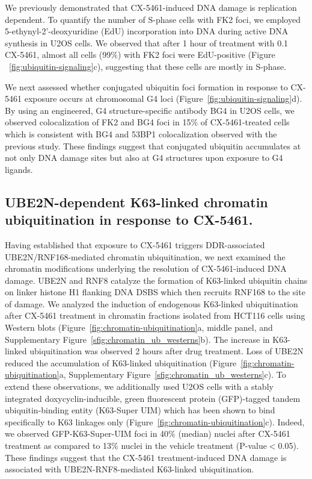 We previously demonstrated that CX-5461-induced DNA damage is replication dependent\cite{Xu2017}. To quantify the number of S-phase cells with FK2 foci, we employed 5-ethynyl-2'-deoxyuridine (EdU) incorporation into DNA during active DNA synthesis in U2OS cells. We observed that after 1 hour of treatment with \SI{0,1}{\micro\Molar} CX-5461, almost all cells (99\%) with FK2 foci were EdU-positive (Figure ~\ref{fig:ubiquitin-signaling}c), suggesting that these cells are mostly in S-phase.

We next assessed whether conjugated ubiquitin foci formation in response to CX-5461 exposure occurs at chromosomal G4 loci (Figure~\ref{fig:ubiquitin-signaling}d). By using an engineered, G4 structure-specific antibody BG4\cite{Biffi2013b} in U2OS cells, we observed colocalization of FK2 and BG4 foci in 15\% of CX-5461-treated cells which is consistent with BG4 and 53BP1 colocalization observed with the previous study\cite{Xu2017}. These findings suggest that conjugated ubiquitin accumulates at not only DNA damage sites but also at G4 structures upon exposure to G4 ligands.   

\subsection{UBE2N-dependent K63-linked chromatin ubiquitination in response to CX-5461.}
Having established that exposure to CX-5461 triggers DDR-associated UBE2N/RNF168-mediated chromatin ubiquitination, we next examined the chromatin modifications underlying the resolution of CX-5461-induced DNA damage. UBE2N and RNF8 catalyze the formation of K63-linked ubiquitin chains on linker histone H1 flanking DNA DSBS which then recruits RNF168 to the site of damage\cite{Thorslund2015}. We analyzed the induction of endogenous K63-linked ubiquitination after CX-5461 treatment in chromatin fractions isolated from HCT116 cells using Western blots (Figure~\ref{fig:chromatin-ubiquitination}a, middle panel, and Supplementary Figure~\ref{sfig:chromatin_ub_westerns}b). The increase in K63-linked ubiquitination was observed 2 hours after drug treatment. Loss of UBE2N reduced the accumulation of K63-linked ubiquitination (Figure~\ref{fig:chromatin-ubiquitination}a, Supplementary Figure~\ref{sfig:chromatin_ub_westerns}c). To extend these observations, we additionally used U2OS cells with a stably integrated doxycyclin-inducible, green fluorescent protein (GFP)-tagged tandem ubiquitin-binding entity (K63-Super UIM) which has been shown to bind specifically to K63 linkages only\cite{Thorslund2015} (Figure~\ref{fig:chromatin-ubiquitination}c). Indeed, we observed GFP-K63-Super-UIM foci in 40\% (median) nuclei after CX-5461 treatment as compared to 13\% nuclei in the vehicle treatment (P-value$<$0.05). These findings suggest that the CX-5461 treatment-induced DNA damage is associated with UBE2N-RNF8-mediated K63-linked ubiquitination. 


